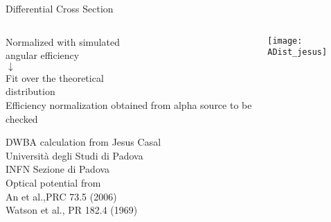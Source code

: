 \begin{frame}{Differential Cross Section}
    	\vspace{-0.05\textheight}
    \begin{overlayarea}{\textwidth}{0.1\textheight}
	\centering
	\end{overlayarea}	
	\vspace{-0.08\textheight}
	\begin{columns}
		\begin{column}{0.4\textwidth}
			\begin{overlayarea}{\textwidth}{\textheight}
				\centering
				Normalized with simulated\\ angular efficiency\\
				$\downarrow$\\
				Fit over the theoretical\\ distribution\\
				\vspace{0.05\textheight}
				Efficiency normalization obtained from alpha source to be checked\\
				\vspace{0.05\textheight}

				\tiny DWBA calculation from Jesus Casal\\
				Università degli Studi di Padova\\
				INFN Sezione di Padova\\				
				\vspace{0.02\textheight}
				Optical potential from\\ An et al.,PRC 73.5 (2006)\\
				Watson et al., PR 182.4 (1969)\\
				 
			\end{overlayarea}
		\end{column}
		\begin{column}{0.6\textwidth}
			\begin{overlayarea}{\textwidth}{\textheight}
				\centering      
				\texttt{[image: ADist\_jesus]}			 				
		    \end{overlayarea}	
		\end{column}
	\end{columns}
\end{frame}


